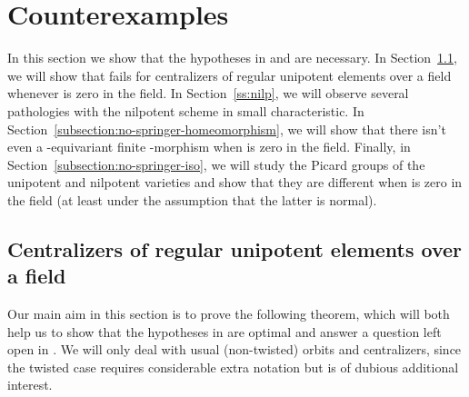 \documentclass[11pt,reqno]{amsart}
\makeatletter
\theoremstyle{definition}
\renewcommand{\rm}{\mathrm}
\newcommand{\sD}{{\mathscr D}}
\newcommand{\sN}{{\mathscr N}}
\newcommand{\sU}{{\mathscr U}}
\newcounter{mathrecordid}
\newcommand{\mathboxbegin}[1]{%
  \stepcounter{mathrecordid}%
  \immediate\write\mathrecords{\themathrecordid,#1}%
  \special{pdf:bann << /Type /Annot /Subtype /Link /Border [0 0 0]
    /MathBoxID \themathrecordid /F 2
    /A << /S /URI /URI (urn:mathbox:\themathrecordid) >> >>}}
\newcommand{\mathboxinlineplain}[1]{$#1$}
\newcommand{\mathboxinline}[1]{%
  $\mathboxbegin{inline}%
  \special{pdf:literal direct /MathBoxBegin\themathrecordid\space MP}%
  #1\special{pdf:literal direct /MathBoxEnd\themathrecordid\space MP}%
  \special{pdf:eann}$}
\newcommand{\recordmath}{%
  \ifmeasuring@\expandafter\mathboxinlineplain
  \else\expandafter\mathboxinline\fi}
\makeatother
\begin{document}
\section{Counterexamples}\label{section:counterexamples}

In this section we show that the hypotheses in \cite[Theorem 3.10]{Integral-Springer} and \cite[Theorem 5.1]{Integral-Springer} are necessary. In Section~\ref{subsection:regular-unipotent-centralizers}, we will show that \cite[Corollary 3.11]{Integral-Springer} fails for centralizers of regular unipotent elements over a field whenever \recordmath{|\pi_1(\sD G)|} is zero in the field. In Section~\ref{ss:nilp}, we will observe several pathologies with the nilpotent scheme in small characteristic. In Section~\ref{subsection:no-springer-homeomorphism}, we will show that there isn't even a \recordmath{G}-equivariant finite \recordmath{k}-morphism \recordmath{\sN_G^{\rm{var}} \to \sU_G^{\rm{var}}} when \recordmath{|\pi_1(\sD G)|} is zero in the field. Finally, in Section~\ref{subsection:no-springer-iso}, we will study the Picard groups of the unipotent and nilpotent varieties and show that they are different when \recordmath{|\pi_1(\sD G)|} is zero in the field (at least under the assumption that the latter is normal).

\subsection{Centralizers of regular unipotent elements over a field}\label{subsection:regular-unipotent-centralizers}

Our main aim in this section is to prove the following theorem, which will both help us to show that the hypotheses in \cite[Theorem 5.1]{Integral-Springer} are optimal and answer a question left open in \cite[Remark 2.7]{BRR}. We will only deal with usual (non-twisted) orbits and centralizers, since the twisted case requires considerable extra notation but is of dubious additional interest.
\end{document}

